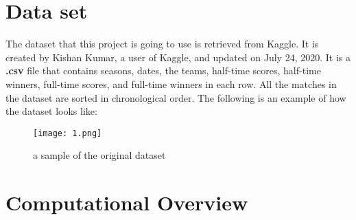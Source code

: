 \documentclass[fontsize=11pt]{article}
\begin{document}
\section*{Data set}

The dataset that this project is going to use is retrieved from Kaggle. It is created by Kishan Kumar, a user of Kaggle, and updated on July 24, 2020. It is a \textbf{.csv} file that contains seasons, dates, the teams, half-time scores, half-time winners, full-time scores, and full-time winners in each row. All the matches in the dataset are sorted in chronological order. The following is an example of how the dataset looks like:

\begin{figure}[h]
    \centering
    \texttt{[image: 1.png]}
    \caption{a sample of the original dataset}
    \label{fig:3}
\end{figure}

\section*{Computational Overview}
\end{document}

